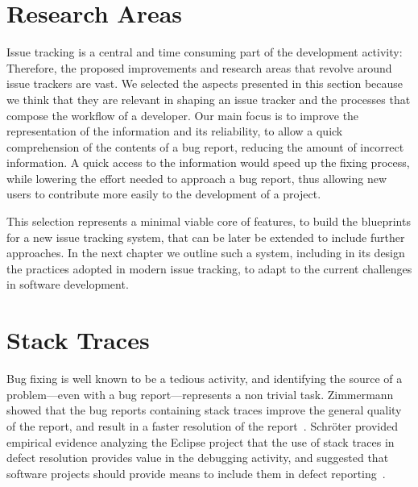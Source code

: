\section{Research Areas}

Issue tracking is a central and time consuming part of the development activity: Therefore, the proposed improvements and research areas that revolve around issue trackers are vast.
We selected the aspects presented in this section because we think that they are relevant in shaping an issue tracker and the processes that compose the workflow of a developer. Our main focus is to improve the representation of the information and its reliability, to allow a quick comprehension of the contents of a bug report, reducing the amount of incorrect information. A quick access to the information would speed up the fixing process, while lowering the effort needed to approach a bug report, thus allowing new users to contribute more easily to the development of a project.

This selection represents a minimal viable core of features, to build the blueprints for a new issue tracking system, that can be later be extended to include further approaches. In the next chapter we outline such a system, including in its design the practices adopted in modern issue tracking, to adapt to the current challenges in software development.





\section{Stack Traces}\label{sec:related-stacktraces}

Bug fixing is well known to be a tedious activity, and identifying the source of a problem---even with a bug report---represents a non trivial task.
Zimmermann \etal showed that the bug reports containing stack traces improve the general quality of the report, and result in a faster resolution of the report~\cite{Zimm2010a}.
Schr\"oter \etal provided empirical evidence analyzing the Eclipse project that the use of stack traces in defect resolution provides value in the debugging activity, and suggested that software projects should provide means to include them in defect reporting~\cite{Schr2010a}.

